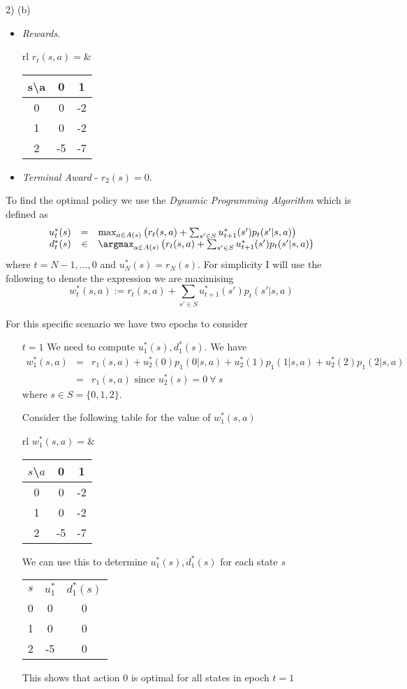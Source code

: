\documentclass[11pt,a4paper]{article}
\begin{document}
\begin{answer}{2) (b)}
\begin{itemize}
    \item \textit{Rewards}.
    \begin{tabular}{rl}
      $r_t(s,a)=$&\begin{tabular}{c|cc}
        s\textbackslash a&0&1\\\hline
        0&0&-2\\
        1&0&-2\\
        2&-5&-7
      \end{tabular}
    \end{tabular}

    \item \textit{Terminal Award} - $r_2(s)=0$.
  \end{itemize}
  To find the optimal policy we use the \textit{Dynamic Programming Algorithm} which is defined as
  \[\begin{array}{rcl}
    u_t^*(s)&=&\max_{a\in A(s)}\left(r_t(s,a)+\sum_{s'\in S}u_{t+1}^*(s')p_t(s'|s,a)\right)\\
    d_t^*(s)&\in&\argmax_{a\in A(s)}\left(r_t(s,a)+\sum_{s'\in S}u_{t+1}^*(s')p_t(s'|s,a)\right)
  \end{array}\]
  where $t=N-1,\dots,0$ and $u_N^*(s)=r_N(s)$.
  For simplicity I will use the following to denote the expression we are maximising
  \[ w_t^*(s,a):=r_t(s,a)+\sum_{s'\in S}u_{t+1}^*(s')p_t(s'|s,a) \]
  \par For this specific scenario we have two epochs to consider
  \begin{itemize}
    \item[$t=1$] We need to compute $u_1^*(s),d_1^*(s)$. We have
    \[\begin{array}{rcl}
      w_1^*(s,a)&=&r_1(s,a)+u_2^*(0)p_1(0|s,a)+u_2^*(1)p_1(1|s,a)+u_2^*(2)p_1(2|s,a)\\
      &=&r_1(s,a)\text{ since }u_2^*(s)=0\ \forall\ s
    \end{array}\]
    where $s\in S=\{0,1,2\}$.
    \par Consider the following table for the value of $w_1^*(s,a)$
    \begin{center}
      \begin{tabular}{rl}
        $w_1^*(s,a)=$&\begin{tabular}{c|cc}
          $s$\textbackslash$a$&0&1\\\hline
          0&0&-2\\
          1&0&-2\\
          2&-5&-7
        \end{tabular}
      \end{tabular}
    \end{center}
    We can use this to determine $u_1^*(s),d_1^*(s)$ for each state $s$
    \begin{center}
        \begin{tabular}{c|c|c}
          $s$&$u_1^*$&$d_1^*(s)$\\
          0&0&0\\
          1&0&0\\
          2&-5&0
        \end{tabular}
    \end{center}
    This shows that action 0 is optimal for all states in epoch $t=1$


\end{itemize}
\end{answer}
\end{document}
